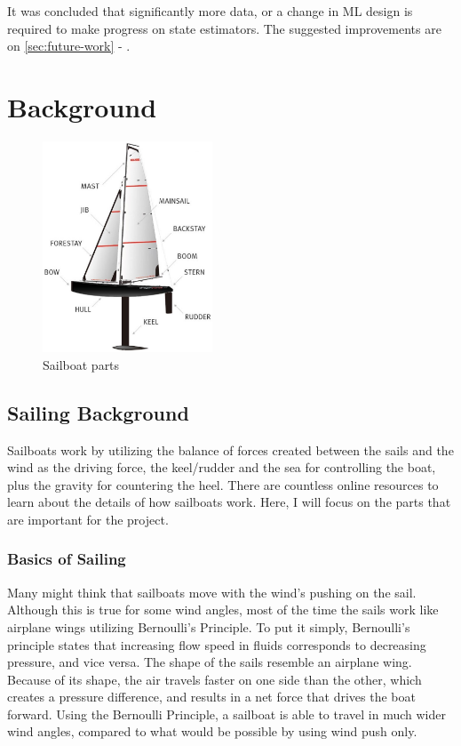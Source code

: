 \documentclass[12pt,twoside]{report}
\begin{document}
It was concluded that significantly more data, or a change in ML design is required to make progress  on state estimators. The suggested improvements are on \ref{sec:future-work} - .


\chapter{Background}

\begin{figure}
\vspace{-11cm}
\centering
\includegraphics[width = 0.45\textwidth]{figures/sailing/sailboat-parts.png}
\caption{Sailboat parts \cite{sail-parts}}
\label{fig:sail-parts}
\end{figure}

\section{Sailing Background}
Sailboats work by utilizing the balance of forces created between the sails and the wind as the driving force, the keel/rudder and the sea for controlling the boat, plus the gravity for countering the heel. There are countless online resources to learn about the details of how sailboats work. Here, I will focus on the parts that are important for the project.

\subsection{Basics of Sailing}
Many might think that sailboats move with the wind's pushing on the sail. Although this is true for some wind angles, most of the time the sails work like airplane wings utilizing Bernoulli's Principle. To put it simply, Bernoulli's principle \cite{wiki:bernoulli} states that increasing flow speed in fluids corresponds to decreasing pressure, and vice versa. The shape of the sails resemble an airplane wing. Because of its shape, the air travels faster on one side than the other, which creates a pressure difference, and results in a net force that drives the boat forward. Using the Bernoulli Principle, a sailboat is able to travel in much wider wind angles, compared to what would be possible by using wind push only.
\end{document}
